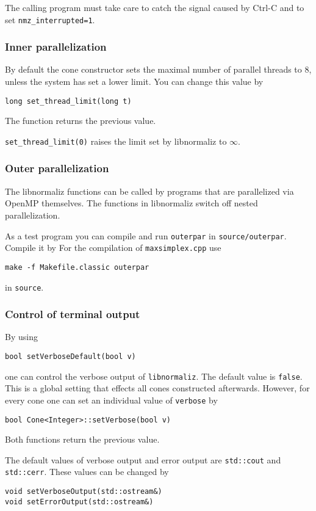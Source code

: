 \documentclass[12pt,a4paper]{scrartcl}
\theoremstyle{definition}
\begin{document}
\begin{small}
The calling program must take care to catch the signal caused by Ctrl-C and to set \verb|nmz_interrupted=1|.

\subsubsection{Inner parallelization}

By default the cone constructor sets the maximal number of parallel threads to $8$, unless the system has set a lower limit. You can change this value by
\begin{Verbatim}
long set_thread_limit(long t)
\end{Verbatim}
The function returns the previous value.

\verb|set_thread_limit(0)| raises the limit set by libnormaliz to $\infty$.

\subsubsection{Outer parallelization}

The libnormaliz functions can be called by programs that are parallelized via OpenMP themselves. The functions in libnormaliz switch off nested parallelization.

As a test program you can compile and run \verb|outerpar| in \verb|source/outerpar|. Compile it by For the compilation of \verb|maxsimplex.cpp| use
\begin{Verbatim}
make -f Makefile.classic outerpar
\end{Verbatim}
in \verb|source|.

\subsubsection{Control of terminal output}
By using
\begin{Verbatim}
bool setVerboseDefault(bool v)
\end{Verbatim}
one can control the verbose output of \verb|libnormaliz|. The default value is \verb|false|. This is a global setting that effects all cones constructed afterwards. However, for every cone one can set an individual value of \verb|verbose| by
\begin{Verbatim}
bool Cone<Integer>::setVerbose(bool v)
\end{Verbatim}
Both functions return the previous value.

The default values of verbose output and error output are \verb|std::cout| and \verb|std::cerr|. These values can be changed by
\begin{Verbatim}
void setVerboseOutput(std::ostream&)
void setErrorOutput(std::ostream&)
\end{Verbatim}


\end{small}
\end{document}
